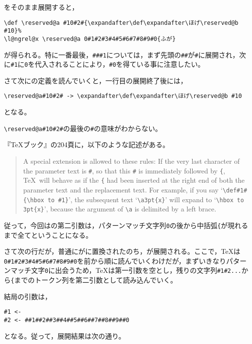 \documentclass[autodetect-engine,dvipdfmx]{jsarticle}
\begin{document}
をそのまま展開すると，
\texsource
\begin{lstlisting}
\def \reserved@a #10#2#{\expandafter\def\expandafter\ほげ\reserved@b #10}%
\l@ngrel@x \reserved@a 0#1#2#3#4#5#6#7#8#9#0{ふが}
\end{lstlisting}
が得られる。特に一番最後，\verb|###1|については，まず先頭の\preSub\verb|##|\preSub が\preSub\verb|#|\preSub に展開され，次に\preSub\verb|#1|に\texttt{0}を代入されることにより，\verb|#0|を得ている事に注意したい。

さて次にの定義を読んでいくと，一行目の展開終了後には，

\begin{lstlisting}
\reserved@a#10#2# -> \expandafter\def\expandafter\ほげ\reserved@b #10
\end{lstlisting}

となる。

\begin{question}
\verb|\reserved@a#10#2#|\preSub の最後の\preSub\verb|#|\preSub の意味がわからない。
\end{question}

\begin{answer}
『\TeX ブック』の204頁に，以下のような記述がある。
\begin{quotation}
A special extension is allowed to these rules: If the very last character of the parameter text is \verb|#|, so that this \verb|#| is immediately followed by \verb|{|, {\TeX}~will behave as if the \verb|{| had been inserted at the right end of both the parameter text and the replacement text. For example, if you say `\verb|\def#1#{\hbox to #1}|', the subsequent text `\verb|\a3pt{x}|' will expand to `\verb|\hbox to 3pt{x}|', because the argument of \verb|\a| is delimited by a left brace.
\end{quotation}

従って，今回はの第二引数は，パターンマッチ文字列\texttt{0}の後から中括弧\preSub\verb|{|\preSub{}が現れるまで全てということになる。
\end{answer}

さて次の行だが，普通にがに置換されたのち，が展開される。ここで，\TeX は\verb|0#1#2#3#4#5#6#7#8#9#0|を前から順に読んでいくわけだが，まずいきなりパターンマッチ文字\texttt{0}に出会うため，\TeX は第一引数を空とし，残りの文字列\preSub\verb|#1#2...|から\preSub\verb|{|\preSub までのトークン列を第二引数として読み込んでいく。

結局の引数は，
\begin{lstlisting}
#1 <- 
#2 <- ##1##2##3##4##5##6##7##8##9##0
\end{lstlisting}
となる。従って，展開結果は次の通り。
\end{document}
